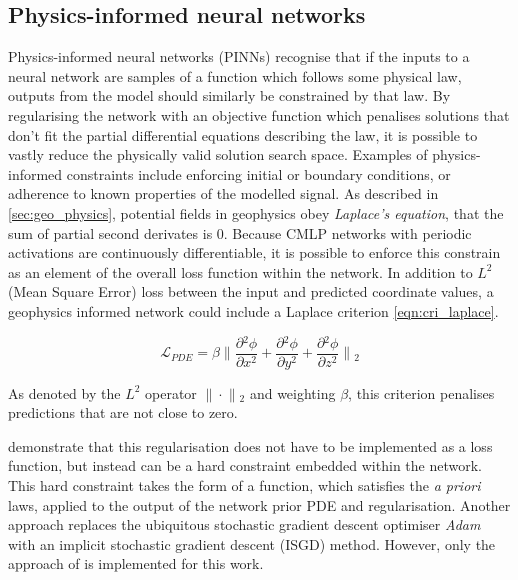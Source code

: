 \documentclass[manuscript.tex]{subfiles}
\begin{document}
\subsection{Physics-informed neural networks}
\label{sec:pinn}
Physics-informed neural networks (PINNs) recognise that if the inputs to a neural network are samples of a function which follows some physical law, outputs from the model should similarly be constrained by that law.
By regularising the network with an objective function which penalises solutions that don't fit the partial differential equations describing the law, it is possible to vastly reduce the physically valid solution search space.
Examples of physics-informed constraints include enforcing initial or boundary conditions, or adherence to known properties of the modelled signal.
As described in \cref{sec:geo_physics}, potential fields in geophysics obey \emph{Laplace's equation}, that the sum of partial second derivates is 0.
Because CMLP networks with periodic activations are continuously differentiable, it is possible to enforce this constrain as an element of the overall loss function within the network.
In addition to \(L^2\) (Mean Square Error) loss between the input and predicted coordinate values, a geophysics informed network could include a Laplace criterion \cref*{eqn:cri_laplace}.

\begin{equation}
    \label{eqn:cri_laplace}
    \mathcal{L}_{PDE} = \beta{}\lVert{}\frac{\partial{}^2\phi}{\partial{}x^2} + \frac{\partial{}^2\phi}{\partial{}y^2} + \frac{\partial{}^2\phi}{\partial{}z^2}\rVert{}_{2}
\end{equation}

As denoted by the \(L^2\) operator \(\lVert{}\cdot{}\rVert{}_{2}\) and weighting \(\beta{}\), this criterion penalises predictions that are not close to zero.

\Textcite{sethiHardEnforcementPhysicsinformed2023} demonstrate that this regularisation does not have to be implemented as a loss function, but instead can be a hard constraint embedded within the network.
This hard constraint takes the form of a function, which satisfies the \emph{a priori} laws, applied to the output of the network prior PDE and regularisation.
Another approach \parencite{liImplicitStochasticGradient2023} replaces the ubiquitous stochastic gradient descent optimiser \emph{Adam} with an implicit stochastic gradient descent (ISGD) method.
However, only the approach of \textcite{benbarkaSeeingImplicitNeural2022} is implemented for this work.
\end{document}
